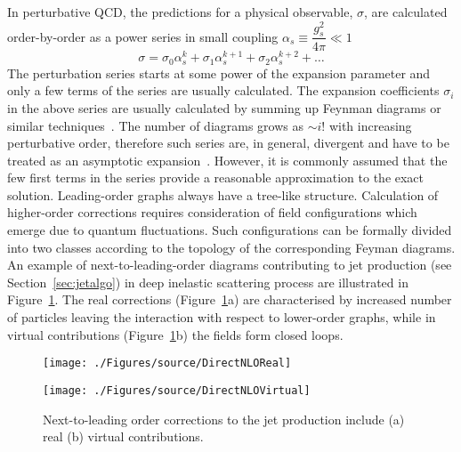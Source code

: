 In perturbative QCD, the predictions for a physical observable, $\sigma$, are calculated order-by-order as a power series in small coupling $\alpha_s \equiv \dfrac{g_s^2}{4\pi} \ll 1$
\begin{equation}
   \sigma=\sigma_{0}\alpha^{k}_s + \sigma_{1}\alpha^{k+1}_s + \sigma_{2}\alpha^{k+2}_s + \ldots
	 \label{eq:pertseries}
\end{equation}
The perturbation series starts at some power of the expansion parameter and only a few terms of the series are usually calculated. The expansion coefficients $\sigma_i$ in the above series are usually calculated by summing up Feynman diagrams or similar techniques~\cite{Henn:2014yza}. The number of diagrams grows as $\sim i!$ with increasing perturbative order, therefore such series are, in general, divergent and have to be treated as an asymptotic expansion~\cite{Ioffe:2010zz}. However, it is commonly assumed that the few first terms in the series provide a reasonable approximation to the exact solution. Leading-order graphs always have a tree-like structure. Calculation of higher-order corrections requires consideration of field configurations which emerge due to quantum fluctuations. Such configurations can be formally divided into two classes according to the topology of the corresponding Feyman diagrams. An example of next-to-leading-order diagrams contributing to jet production (see Section~\ref{sec:jetalgo}) in deep inelastic scattering process are illustrated in Figure~\ref{fig:nlojetfeyn}. The real corrections (Figure~\ref{fig:nlojetfeyn}a) are characterised by increased number of particles leaving the interaction with respect to lower-order graphs, while in virtual contributions (Figure~\ref{fig:nlojetfeyn}b) the fields form closed loops.
 
\begin{figure}[h]
	\begin{subfloat}[]{
		\texttt{[image: ./Figures/source/DirectNLOReal]}
		\label{fig:nlojetfeynvirtual}
	 }%
	\end{subfloat}\hfill
	\begin{subfloat}[]{
		\texttt{[image: ./Figures/source/DirectNLOVirtual]}
		\label{fig:nlojetfeynreal}
	}%
	\end{subfloat}
\caption{Next-to-leading order corrections to the jet production include (a) real (b) virtual contributions.}
\label{fig:nlojetfeyn}
\end{figure}

